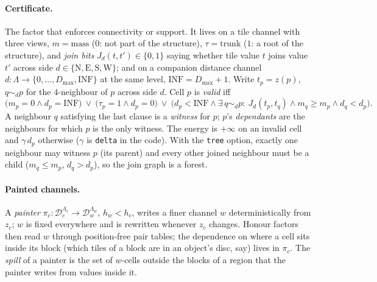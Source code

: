 \documentclass[11pt]{article}
\newcommand{\1}{\mathds{1}}
\newcommand{\Dom}{\mathcal{D}}
\newcommand{\code}[1]{\texttt{#1}}
\begin{document}
\paragraph{Certificate.} The factor that enforces connectivity or support. It lives
on a tile channel with three views, $m = \mathrm{mass}$ ($0$: not part of the structure),
$\tau = \mathrm{trunk}$ ($1$: a root of the structure), and \emph{join bits}
$J_d(t, t') \in \{0,1\}$ saying whether tile value $t$ joins value $t'$ across side
$d \in \{\mathrm{N}, \mathrm{E}, \mathrm{S}, \mathrm{W}\}$; and on a companion distance channel
$d : \Lambda \to \{0, \dots, D_{\max}, \mathrm{INF}\}$ at the same level, $\mathrm{INF} = D_{\max} + 1$.
Write $t_p = z(p)$, $q \sim_d p$ for the 4-neighbour of $p$ across side $d$. Cell $p$ is
\emph{valid} iff
\begin{equation}
  \big(m_p = 0 \wedge d_p = \mathrm{INF}\big) \ \vee\
  \big(\tau_p = 1 \wedge d_p = 0\big) \ \vee\
  \Big(d_p < \mathrm{INF} \wedge \exists\, q \sim_d p:\ J_d(t_p, t_q) \wedge m_q \ge m_p \wedge d_q < d_p\Big).
\end{equation}
A neighbour $q$ satisfying the last clause is a \emph{witness} for $p$; $p$'s \emph{dependants}
are the neighbours for which $p$ is the only witness. The energy is $+\infty$ on an invalid cell
and $\gamma\, d_p$ otherwise ($\gamma$ is \code{delta} in the code). With the \code{tree} option,
exactly one neighbour may witness $p$ (its parent) and every other joined neighbour must be a
child ($m_q \le m_p$, $d_q > d_p$), so the join graph is a forest.

\paragraph{Painted channels.} A \emph{painter} $\pi_c : \Dom_c^{\Lambda_c} \to \Dom_w^{\Lambda_w}$,
$h_w < h_c$, writes a finer channel $w$ deterministically from $z_c$; $w$ is fixed everywhere and
is rewritten whenever $z_c$ changes. Honour factors then read $w$ through position-free pair
tables; the dependence on where a cell sits inside its block (which tiles of a block are in an
object's disc, say) lives in $\pi_c$. The \emph{spill} of a painter is the set of $w$-cells
outside the blocks of a region that the painter writes from values inside it.

\end{document}
